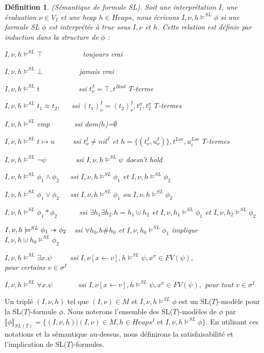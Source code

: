 \documentclass[11pt,openany]{article}
\newcommand\sepimp{\mathrel{-\mkern-6mu*}}
\newcommand\phibra{\llbracket\phi\rrbracket}
\newtheorem{definition}{D\'efinition}[subsection]
\begin{document}
	\begin{definition}
	(S\'emantique de formule SL). Soit une interpr\'etation $I$, une \'evaluation $\nu\in V_{I}$ et une heap $h\in Heaps$, nous \'ecrivons $I,\nu,h\models^{SL}\phi$ si une formule SL $\phi$ est interpr\'et\'ee \`a true sous $I,\nu$ et $h$. Cette relation est d\'efinie par induction  dans la structure de $\phi$ :\par
	$I,\nu,h\models^{SL}\top$~~~~~~~~~~~toujours vrai\par
$I,\nu,h\models^{SL}\bot$~~~~~~~~~~jamais vrai\par
$I,\nu,h\models^{SL} t$~~~~~~~~~~ ssi $t^{I}_{\nu}=\top,t^{Bool}$ $T$-terme\par
$I,\nu,h\models^{SL} t_{1}\approx t_{2},$~~~ssi $(t_{1})^{I}_{\nu}=(t_{2})^{I}_{\nu},t^{\sigma}_{1},t^{\sigma}_{2}$ $T$-termes\par
$I,\nu,h\models^{SL}$emp ~~~~~~ssi dom($h$)=$\emptyset$\par
$I,\nu,h\models^{SL}t\mapsto u$~~~~~ssi $t^{I}_{\nu}\neq nil^{I}$ et $h = \{(t^{I}_{\nu},u^{I}_{\nu} )\}, t^{Loc}, u^{Loc}_{i}$ $T$-termes \par
$I,\nu,h\models^{SL}\neg\psi$~~~~~~~~ssi $I,\nu,h\models^{SL}\psi$ doesn't hold\par
$I,\nu,h\models^{SL}\phi_{1}\land\phi_{2}$~~~ssi $I,\nu,h\models^{SL}\phi_{1}$ et $I,\nu,h\models^{SL}\phi_{2}$\par
$I,\nu,h\models^{SL}\phi_{1}\lor\phi_{2}$~~~ssi $I,\nu,h\models^{SL}\phi_{1}$ ou $I,\nu,h\models^{SL}\phi_{2}$\par
$I,\nu,h\models^{SL}\phi_{1}*\phi_{2}$~~~~~~ssi $\exists h_{1}\exists h_{2}.h=h_{1}\cupdot h_{2}$ et $I,\nu,h_{1}\models^{SL}\phi_{1}$ et $I,\nu,h_{2}\models^{SL}\phi_{2}$\par
$I,\nu,h\models^{SL}\phi_{1}\sepimp\phi_{2}$~~ssi $\forall h_{0}.h\#h_{0}$ et $I,\nu,h_{0}\models^{SL}\phi_{1}$ implique \\$I,\nu,h\cupdot h_{0}\models^{SL}\phi_{2}$\par
$I,\nu,h\models^{SL}\exists x.\psi$~~~~~ssi $I,\nu[x\leftarrow v],h\models^{SL}\psi, x^{\sigma}\in FV(\psi),$ \\pour certains $v\in\sigma^{I}$\par
$I,\nu,h\models^{SL}\forall x.\psi$~~~~~~~ssi $I,\nu[x\leftarrow v],h\models^{SL}\psi, x^{\sigma}\in FV(\psi),$ pour tout $v\in\sigma^{I}$
	\end{definition}
	Un tripl\'e $(I,\nu,h)$ tel que $(I,\nu)\in M$ et $I,\nu,h\models^{SL}\phi$ est un SL($T$)-mod\`ele pour la SL($T$)-formule $\phi$. Nous noterons l'ensemble des SL($T$)-mod\`eles de $\phi$ par $\phibra_{SL(T)} = \{(I,\nu,h)|(I,\nu)\in M,h\in Heaps^{I}$ et $I,\nu,h\models^{SL}\phi\}$. En utilisant ces notations et la s\'emantique au-dessus, nous d\'efinirons la satisfaisabilit\'e et l'implication de SL($T$)-formules.
\end{document}
